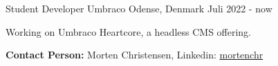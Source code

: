 \begin{cventries}
\cventry
{Student Developer} %
{Umbraco} %
{Odense, Denmark} %
{Juli 2022 - now} %
{
  \begin{cvitems}
    \item {Working on Umbraco Heartcore, a headless CMS offering.}
    \item {\textbf{Contact Person:} Morten Christensen, Linkedin: \href{https://www.linkedin.com/in/mortenchr/}{mortenchr}}
  \end{cvitems}
}
\end{cventries}
